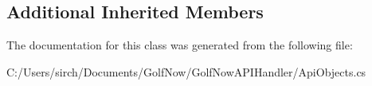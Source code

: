 \subsection*{Additional Inherited Members}


The documentation for this class was generated from the following file\+:\begin{DoxyCompactItemize}
\item 
C\+:/\+Users/sirch/\+Documents/\+Golf\+Now/\+Golf\+Now\+A\+P\+I\+Handler/Api\+Objects.\+cs\end{DoxyCompactItemize}
